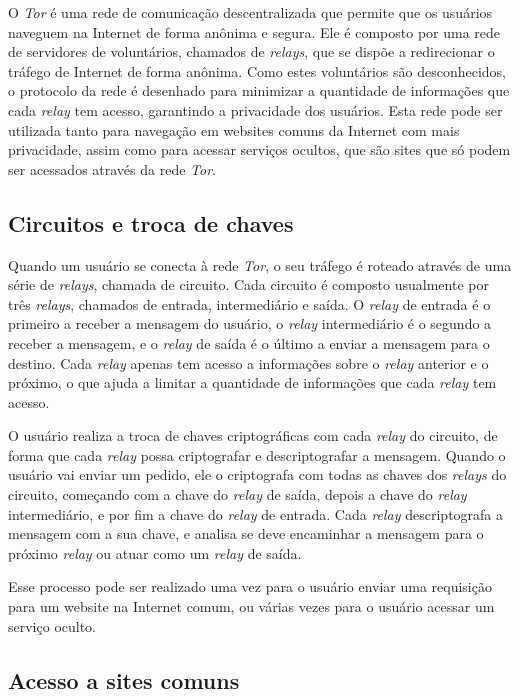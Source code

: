 O \textit{Tor} é uma rede de comunicação descentralizada que permite que os usuários naveguem na Internet de forma anônima e segura. Ele é composto por uma rede de servidores de voluntários, chamados de \textit{relays}, que se dispõe a redirecionar o tráfego de Internet de forma anônima. Como estes voluntários são desconhecidos, o protocolo da rede é desenhado para minimizar a quantidade de informações que cada \textit{relay} tem acesso, garantindo a privacidade dos usuários. Esta rede pode ser utilizada tanto para navegação em websites comuns da Internet com mais privacidade, assim como para acessar serviços ocultos, que são sites que só podem ser acessados através da rede \textit{Tor}.

\subsection{Circuitos e troca de chaves}

Quando um usuário se conecta à rede \textit{Tor}, o seu tráfego é roteado através de uma série de \textit{relays}, chamada de circuito. Cada circuito é composto usualmente por três \textit{relays}, chamados de entrada, intermediário e saída. O \textit{relay} de entrada é o primeiro a receber a mensagem do usuário, o \textit{relay} intermediário é o segundo a receber a mensagem, e o \textit{relay} de saída é o último a enviar a mensagem para o destino. Cada \textit{relay} apenas tem acesso a informações sobre o \textit{relay} anterior e o próximo, o que ajuda a limitar a quantidade de informações que cada \textit{relay} tem acesso.

O usuário realiza a troca de chaves criptográficas com cada \textit{relay} do circuito, de forma que cada \textit{relay} possa criptografar e descriptografar a mensagem. Quando o usuário vai enviar um pedido, ele o criptografa com todas as chaves dos \textit{relays} do circuito, começando com a chave do \textit{relay} de saída, depois a chave do \textit{relay} intermediário, e por fim a chave do \textit{relay} de entrada. Cada \textit{relay} descriptografa a mensagem com a sua chave, e analisa se deve encaminhar a mensagem para o próximo \textit{relay} ou atuar como um \textit{relay} de saída.

Esse processo pode ser realizado uma vez para o usuário enviar uma requisição para um website na Internet comum, ou várias vezes para o usuário acessar um serviço oculto.

\subsection{Acesso a sites comuns}

